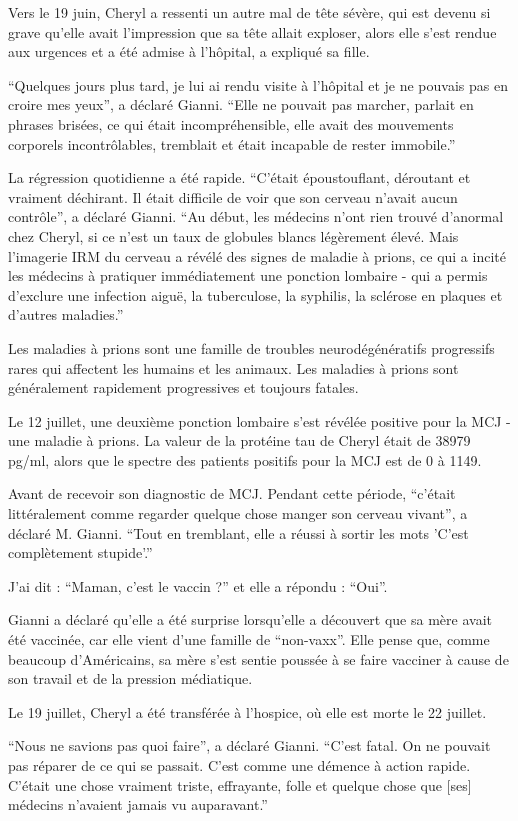 {Vers le 19 juin, Cheryl a ressenti un autre mal de tête sévère, qui est devenu
si grave qu'elle avait l'impression que sa tête allait exploser, alors elle
s'est rendue aux urgences et a été admise à l'hôpital, a expliqué sa fille.

“Quelques jours plus tard, je lui ai rendu visite à l'hôpital et je ne pouvais
pas en croire mes yeux”, a déclaré Gianni. “Elle ne pouvait pas marcher, parlait
en phrases brisées, ce qui était incompréhensible, elle avait des mouvements
corporels incontrôlables, tremblait et était incapable de rester immobile.”

La régression quotidienne a été rapide. “C'était époustouflant, déroutant et
vraiment déchirant. Il était difficile de voir que son cerveau n'avait aucun
contrôle”, a déclaré Gianni. “Au début, les médecins n'ont rien trouvé d'anormal
chez Cheryl, si ce n'est un taux de globules blancs légèrement élevé. Mais
l'imagerie IRM du cerveau a révélé des signes de maladie à prions, ce qui a
incité les médecins à pratiquer immédiatement une ponction lombaire - qui a
permis d'exclure une infection aiguë, la tuberculose, la syphilis, la sclérose
en plaques et d'autres maladies.”

Les maladies à prions sont une famille de troubles neurodégénératifs progressifs
rares qui affectent les humains et les animaux. Les maladies à prions sont
généralement rapidement progressives et toujours fatales.

Le 12 juillet, une deuxième ponction lombaire s'est révélée positive pour la MCJ
- une maladie à prions. La valeur de la protéine tau de Cheryl était de 38979
pg/ml, alors que le spectre des patients positifs pour la MCJ est de 0 à 1149.

Avant de recevoir son diagnostic de MCJ. Pendant cette période, “c'était
littéralement comme regarder quelque chose manger son cerveau vivant”, a déclaré
M. Gianni. “Tout en tremblant, elle a réussi à sortir les mots 'C'est
complètement stupide'.”

J'ai dit : “Maman, c'est le vaccin ?” et elle a répondu : “Oui”.

Gianni a déclaré qu'elle a été surprise lorsqu'elle a découvert que sa mère
avait été vaccinée, car elle vient d'une famille de “non-vaxx”. Elle pense que,
comme beaucoup d'Américains, sa mère s'est sentie poussée à se faire vacciner à
cause de son travail et de la pression médiatique.

Le 19 juillet, Cheryl a été transférée à l'hospice, où elle est morte le 22
juillet.

“Nous ne savions pas quoi faire”, a déclaré Gianni. “C'est fatal. On ne pouvait
pas réparer de ce qui se passait. C'est comme une démence à action
rapide. C'était une chose vraiment triste, effrayante, folle et quelque chose
que [ses] médecins n'avaient jamais vu auparavant.”

}

